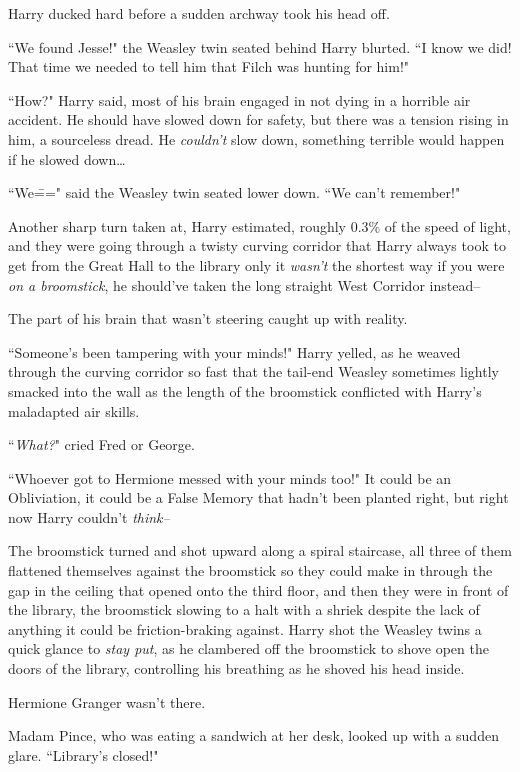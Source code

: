 Harry ducked hard before a sudden archway took his head off.

``We found Jesse!" the Weasley twin seated behind Harry blurted. ``I know we did! That time we needed to tell him that Filch was hunting for him!"

``How?" Harry said, most of his brain engaged in not dying in a horrible air accident. He should have slowed down for safety, but there was a tension rising in him, a sourceless dread. He \emph{couldn't} slow down, something terrible would happen if he slowed down{\ldots}

``We\===" said the Weasley twin seated lower down. ``We can't remember!"

Another sharp turn taken at, Harry estimated, roughly 0.3\% of the speed of light, and they were going through a twisty curving corridor that Harry always took to get from the Great Hall to the library only it \emph{wasn't} the shortest way if you were \emph{on a broomstick}, he should've taken the long straight West Corridor instead\---

The part of his brain that wasn't steering caught up with reality.

``Someone's been tampering with your minds!" Harry yelled, as he weaved through the curving corridor so fast that the tail-end Weasley sometimes lightly smacked into the wall as the length of the broomstick conflicted with Harry's maladapted air skills.

``\emph{What?}" cried Fred or George.

``Whoever got to Hermione messed with your minds too!" It could be an Obliviation, it could be a False Memory that hadn't been planted right, but right now Harry couldn't \emph{think\---}

The broomstick turned and shot upward along a spiral staircase, all three of them flattened themselves against the broomstick so they could make in through the gap in the ceiling that opened onto the third floor, and then they were in front of the library, the broomstick slowing to a halt with a shriek despite the lack of anything it could be friction-braking against. Harry shot the Weasley twins a quick glance to \emph{stay put}, as he clambered off the broomstick to shove open the doors of the library, controlling his breathing as he shoved his head inside.

Hermione Granger wasn't there.

Madam Pince, who was eating a sandwich at her desk, looked up with a sudden glare. ``Library's closed!"

